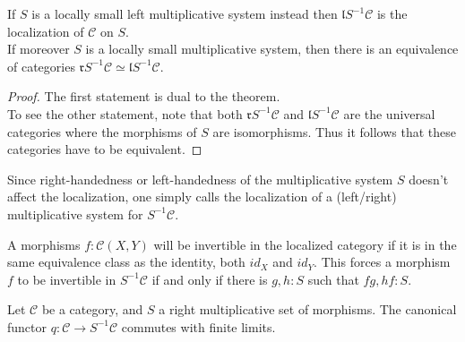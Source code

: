     \begin{corollary}
        If $S$ is a locally small left multiplicative system instead then $\mathfrak{l}S^{-1}\mathcal{C}$ is the localization of $\mathcal{C}$ on $S$. \\

        If moreover $S$ is a locally small multiplicative system, then there is an equivalence of categories $\mathfrak{r}S^{-1}\mathcal{C}\simeq\mathfrak{l}S^{-1}\mathcal{C}$.
    \end{corollary}

    \begin{proof}
        The first statement is dual to the theorem. \\

        To see the other statement, note that both $\mathfrak{r}S^{-1}\mathcal{C}$ and $\mathfrak{l}S^{-1}\mathcal{C}$ are the universal categories where the morphisms of $S$ are isomorphisms. Thus it follows that these categories have to be equivalent.
    \end{proof}

    \begin{remark}
        Since right-handedness or left-handedness of the multiplicative system $S$ doesn't affect the localization, one simply calls the localization of a (left/right) multiplicative system for $S^{-1}\mathcal{C}$.
    \end{remark}

    \begin{remark}
        A morphisms $f:\mathcal{C}(X,Y)$ will be invertible in the localized category if it is in the same equivalence class as the identity, both $id_X$ and $id_Y$. This forces a morphism $f$ to be invertible in $S^{-1}\mathcal{C}$ if and only if there is $g,h:S$ such that $fg,hf:S$.
    \end{remark}

    \begin{prop}
        Let $\mathcal{C}$ be a category, and $S$ a right multiplicative set of morphisms. The canonical functor $q:\mathcal{C}\rightarrow S^{-1}\mathcal{C}$ commutes with finite limits.
    \end{prop}

